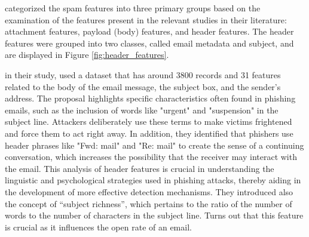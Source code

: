 
\citet{8257764} categorized the spam features into three primary groups based on the examination of the features present in the relevant studies in their literature: attachment features, payload (body) features, and header features. The header features were grouped into two classes, called email metadata and subject, and are displayed in Figure \ref{fig:header_features}.



\citet{Abadla202312} in their study, used a dataset that has around 3800 records and 31 features related to the body of the email message, the subject box, and the sender’s address.
The proposal highlights specific characteristics often found in phishing emails, such as the inclusion of words like "urgent" and "suspension" in the subject line. Attackers deliberately use these terms to make victims frightened and force them to act right away. In addition, they identified that phishers use header phrases like "Fwd: mail" and "Re: mail" to create the sense of a continuing conversation, which increases the possibility that the receiver may interact with the email. This analysis of header features is crucial in understanding the linguistic and psychological strategies used in phishing attacks, thereby aiding in the development of more effective detection mechanisms. They introduced also the concept of “subject richness”, which pertains to the ratio of the number of words to the number of characters in the subject line. Turns out that this feature is crucial as it influences the open rate of an email.


\begin{comment}
The first step is to understand why people fall for phishing. Something in phishing emails lures the victims into clicking on some malicious link or providing confidential information.~\citet{butavicius2022people} performed a study where the objective was to understand why that happens. For that, they conducted an online experiment, and participants underwent an email classification task designed to examine susceptibility to phishing. In the study's discussion, it was mentioned that participants phishing email detection skills were poor. They correctly identified phishing only 42\% of the time and incorrectly flagged emails that were legitimate 31\% of the time. Despite the emails having leakage cues such as poor grammar, spelling, and punctuation the majority still fell for the attack and clicked the fake malicious link provided. 
\end{comment}


